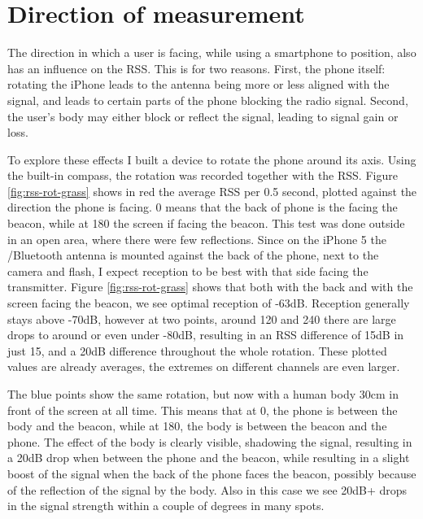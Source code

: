\section{Direction of measurement}
\label{sec:rss-rot}

The direction in which a user is facing, while using a smartphone to position, also has an influence on the RSS.
This is for two reasons.
First, the phone itself: rotating the iPhone leads to the antenna being more or less aligned with the signal, and leads to certain parts of the phone blocking the radio signal.
Second, the user's body may either block or reflect the signal, leading to signal gain or loss.


To explore these effects I built a device to rotate the phone around its axis.
Using the built-in compass, the rotation was recorded together with the RSS.
Figure \ref{fig:rss-rot-grass} shows in red the average RSS per 0.5 second, plotted against the direction the phone is facing.
0\textdegree{} means that the back of phone is the facing the beacon, while at 180\textdegree{} the screen if facing the beacon.
This test was done outside in an open area, where there were few reflections.
Since on the iPhone 5 the \wifi/Bluetooth antenna is mounted against the back of the phone, next to the camera and flash, I expect reception to be best with that side facing the transmitter.
Figure \ref{fig:rss-rot-grass} shows that both with the back and with the screen facing the beacon, we see optimal reception of -63dB.
Reception generally stays above -70dB, however at two points, around 120\textdegree{} and 240\textdegree{} there are large drops to around or even under -80dB, resulting in an RSS difference of 15dB in just 15\textdegree{}, and a 20dB difference throughout the whole rotation.
These plotted values are already averages, the extremes on different channels are even larger.

The blue points show the same rotation, but now with a human body 30cm in front of the screen at all time.
This means that at 0\textdegree{}, the phone is between the body and the beacon, while at 180\textdegree{}, the body is between the beacon and the phone.
The effect of the body is clearly visible, shadowing the signal, resulting in a 20dB drop when between the phone and the beacon, while resulting in a slight boost of the signal when the back of the phone faces the beacon, possibly because of the reflection of the signal by the body.
Also in this case we see 20dB+ drops in the signal strength within a couple of degrees in many spots.

